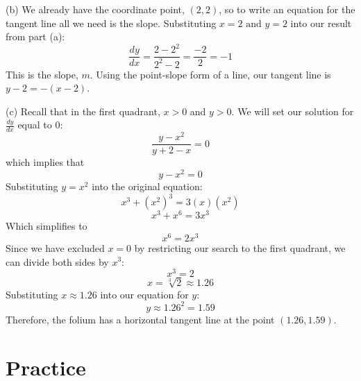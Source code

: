 (b) We already have the coordinate point, $(2, 2)$, so to write an equation for the tangent line all we need is the slope. Substituting $x=2 \text{ and }y=2$ into our result from part (a):
$$\frac{dy}{dx}=\frac{2-2^2}{2^2-2}=\frac{-2}{2}=-1$$
This is the slope, $m$. Using the point-slope form of a line, our tangent line is $y-2=-(x-2)$. 

(c) Recall that in the first quadrant, $x > 0$ and $y > 0$. We will set our solution for $\frac{dy}{dx}$  equal to 0:
$$\frac{y-x^2}{y+2-x}=0$$ which implies that $$y-x^2=0$$ Substituting $y=x^2$ into the original equation: $$x^3 + (x^2)^3 = 3(x)(x^2)$$ $$x^3+x^6=3x^3$$ Which simplifies to $$x^6=2x^3$$Since we have excluded $x=0$ by restricting our search to the first quadrant, we can divide both sides by $x^3$: $$x^3=2$$ $$x=\sqrt[3]{2} \approx 1.26$$
Substituting $x \approx 1.26$ into our equation for $y$: $$y \approx 1.26^2 = 1.59$$ Therefore, the folium has a horizontal tangent line at the point $(1.26, 1.59)$.

\section{Practice}
